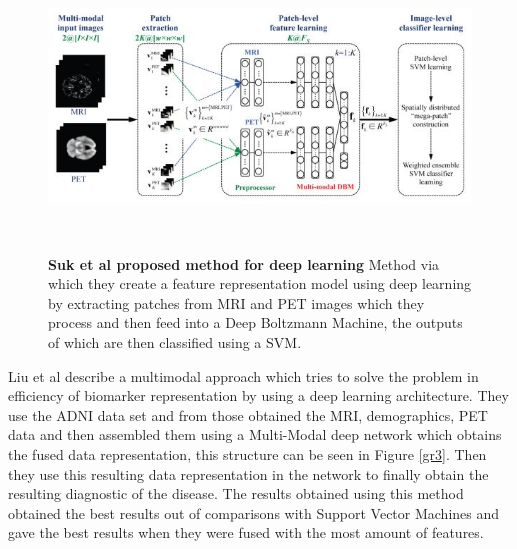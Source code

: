 \begin{figure}[th]
\centerline{\includegraphics[width=5in,height=3in]{images/background/gr2.jpg}}
\caption{{\bf Suk et al proposed method for deep learning\cite{Suk2014}}{ Method via which they create a feature representation model using deep learning by extracting patches from MRI and PET images which they process and then feed into a Deep Boltzmann Machine, the outputs of which are then classified using a SVM. }}
\label{gr2}
\end{figure}

Liu et al describe\cite{Liu2015} a multimodal approach which tries to solve the problem in efficiency of biomarker representation by using a deep learning architecture. They use the ADNI data set and from those obtained the MRI, demographics, PET data and then assembled them using a Multi-Modal deep network which obtains the fused data representation, this structure can be seen in Figure \ref{gr3}. Then they use this resulting data representation in the network to finally obtain the resulting diagnostic of the disease. The results obtained using this method obtained the best results out of comparisons with Support Vector Machines and gave the best results when they were fused with the most amount of features.

